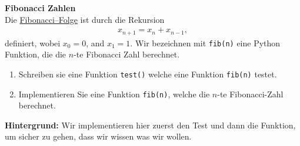 \textbf{Fibonacci Zahlen}\\
Die \hyperref{https://de.wikipedia.org/wiki/Fibonacci-Folge}{}{}{Fibonacci--Folge} ist durch die Rekursion
\begin{align*}
	x_{n+1} = x_n + x_{n-1},
\end{align*}
definiert, wobei $x_0 = 0$, and $x_1 = 1$. Wir bezeichnen mit \verb|fib(n)| 
eine Python Funktion, die die $n$-te Fibonacci Zahl berechnet.
\begin{enumerate}
	\item Schreiben sie eine Funktion \verb|test()| welche eine Funktion \verb|fib(n)| testet.
	\item Implementieren Sie eine Funktion \texttt{fib(n)}, welche die $n$-te Fibonacci-Zahl berechnet.
\end{enumerate}

\textbf{Hintergrund: } Wir implementieren hier zuerst den Test und dann die Funktion, um sicher zu gehen, dass wir wissen was wir wollen. \\
